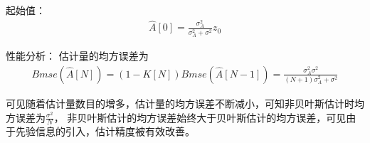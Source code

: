 \documentclass[fontset=windows]{article}
\numberwithin{figure}{section}
\begin{document}
起始值：
\begin{align*}
	\hat{A}[0]=\frac{\sigma^2_A}{\sigma^2_A+\sigma^2}z_0
\end{align*}

性能分析：
估计量的均方误差为
\begin{align*}
	Bmse(\hat{A}[N])=(1-K[N])Bmse(\hat{A}[N-1])=\frac{\sigma_A^2\sigma^2}{(N+1)\sigma^2_A+\sigma^2}
\end{align*}

可见随着估计量数目的增多，估计量的均方误差不断减小，可知非贝叶斯估计时均方误差为\(\frac{\sigma^2}{N}\)，
非贝叶斯估计的均方误差始终大于贝叶斯估计的均方误差，可见由于先验信息的引入，估计精度被有效改善。


\end{document}
